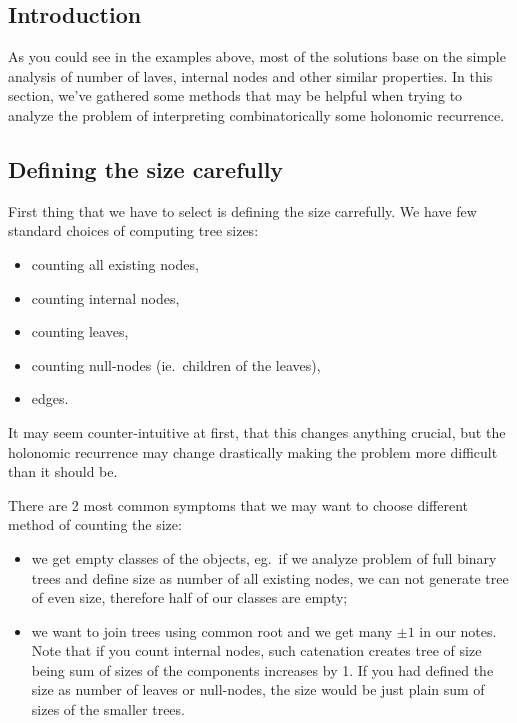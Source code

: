 \documentclass[final]{article}
\theoremstyle{definition}
\theoremstyle{remark}
\begin{document}
\subsection{Introduction}%
\label{sub:introduction}

As you could see in the examples above, most of the solutions base on the simple analysis of number of laves, internal nodes and other similar properties. In this section, we've gathered some methods that may be helpful when trying to analyze the problem of interpreting combinatorically some holonomic recurrence.

\subsection{Defining the size carefully}%
\label{sub:defining_the_size_carefully}

First thing that we have to select is defining the size carrefully. We have few standard choices of computing tree sizes:
\begin{itemize}
    \item counting all existing nodes,
    \item counting internal nodes,
    \item counting leaves,
    \item counting null-nodes (ie.\ children of the leaves),
    \item edges.
\end{itemize}

It may seem counter-intuitive at first, that this changes anything crucial, but the holonomic recurrence may change drastically making the problem more difficult than it should be.

There are 2 most common symptoms that we may want to choose different method of counting the size:
\begin{itemize}
    \item we get empty classes of the objects, eg.\ if we analyze problem of full binary trees and define size as number of all existing nodes, we can not generate tree of even size, therefore half of our classes are empty;
    \item we want to join trees using common root and we get many \(\pm1\) in our notes. Note that if you count internal nodes, such catenation creates tree of size being sum of sizes of the components increases by 1. If you had defined the size as number of leaves or null-nodes, the size would be just plain sum of sizes of the smaller trees. 
\end{itemize}
\end{document}
